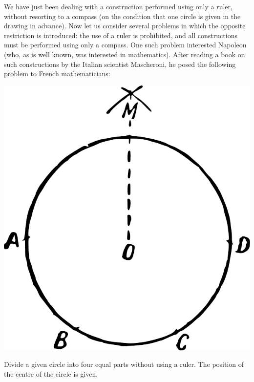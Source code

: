 We have just been dealing with a construction performed using only a ruler, without resorting to a compass (on the condition that one circle is given in the drawing in advance). Now let us consider several problems in which the opposite restriction is introduced: the use of a ruler is prohibited, and all constructions must be performed using only a compass. One such problem interested Napoleon (who, as is well known, was interested in mathematics). After reading a book on such constructions by the Italian scientist Mascheroni, he posed the following problem to French mathematicians:
\begin{marginfigure}[-0.5cm]%
\centering
\includegraphics[width=\textwidth]{figures/ch-10/fig-145.pdf}
\end{marginfigure}

\ques Divide a given circle into four equal parts without using a ruler. The position of the centre of the circle is given.




